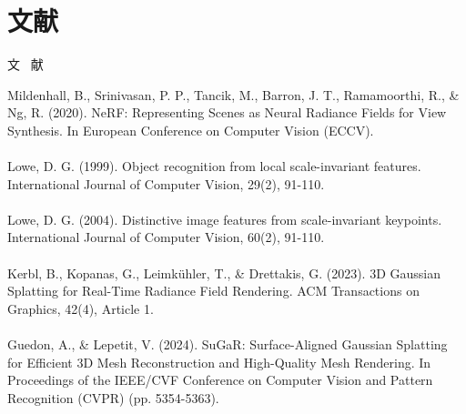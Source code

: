 \documentclass{nwputhesis}
\begin{document}
\section*{文献}
\begin{center}
    { \blackti \fontsize{16.0600pt}{1.25}文 \, 献}
\end{center}
\noindent
Mildenhall, B., Srinivasan, P. P., Tancik, M., Barron, J. T., Ramamoorthi, R., \& Ng, R. (2020). NeRF: 
Representing Scenes as Neural Radiance Fields for View Synthesis. In European Conference on Computer Vision 
(ECCV).\\\\
Lowe, D. G. (1999). Object recognition from local scale-invariant features. International Journal of Computer Vision, 29(2), 91-110.\\\\
Lowe, D. G. (2004). Distinctive image features from scale-invariant keypoints. International Journal of Computer Vision, 60(2), 91-110.\\\\
Kerbl, B., Kopanas, G., Leimkühler, T., \& Drettakis, G. (2023). 3D Gaussian Splatting for Real-Time Radiance Field Rendering. ACM Transactions on Graphics, 42(4), Article 1. \\\\
Guedon, A., \& Lepetit, V. (2024). SuGaR: Surface-Aligned Gaussian Splatting for Efficient 3D Mesh Reconstruction and High-Quality Mesh Rendering. In Proceedings of the IEEE/CVF Conference on Computer Vision and Pattern Recognition (CVPR) (pp. 5354-5363). \\\\
\end{document}
